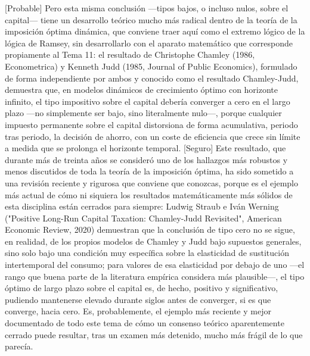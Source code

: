 \documentclass[10pt,a4paper]{article}
\begin{document}
[Probable] Pero esta misma conclusión —tipos bajos, o incluso nulos, sobre el capital— tiene un desarrollo teórico mucho más radical dentro de la teoría de la imposición óptima dinámica, que conviene traer aquí como el extremo lógico de la lógica de Ramsey, sin desarrollarlo con el aparato matemático que corresponde propiamente al Tema 11: el resultado de Christophe Chamley (1986, Econometrica) y Kenneth Judd (1985, Journal of Public Economics), formulado de forma independiente por ambos y conocido como el resultado Chamley-Judd, demuestra que, en modelos dinámicos de crecimiento óptimo con horizonte infinito, el tipo impositivo sobre el capital debería converger a cero en el largo plazo —no simplemente ser bajo, sino literalmente nulo—, porque cualquier impuesto permanente sobre el capital distorsiona de forma acumulativa, periodo tras periodo, la decisión de ahorro, con un coste de eficiencia que crece sin límite a medida que se prolonga el horizonte temporal. [Seguro] Este resultado, que durante más de treinta años se consideró uno de los hallazgos más robustos y menos discutidos de toda la teoría de la imposición óptima, ha sido sometido a una revisión reciente y rigurosa que conviene que conozcas, porque es el ejemplo más actual de cómo ni siquiera los resultados matemáticamente más sólidos de esta disciplina están cerrados para siempre: Ludwig Straub e Iván Werning ("Positive Long-Run Capital Taxation: Chamley-Judd Revisited", American Economic Review, 2020) demuestran que la conclusión de tipo cero no se sigue, en realidad, de los propios modelos de Chamley y Judd bajo supuestos generales, sino solo bajo una condición muy específica sobre la elasticidad de sustitución intertemporal del consumo; para valores de esa elasticidad por debajo de uno —el rango que buena parte de la literatura empírica considera más plausible—, el tipo óptimo de largo plazo sobre el capital es, de hecho, positivo y significativo, pudiendo mantenerse elevado durante siglos antes de converger, si es que converge, hacia cero. Es, probablemente, el ejemplo más reciente y mejor documentado de todo este tema de cómo un consenso teórico aparentemente cerrado puede resultar, tras un examen más detenido, mucho más frágil de lo que parecía.
\end{document}
